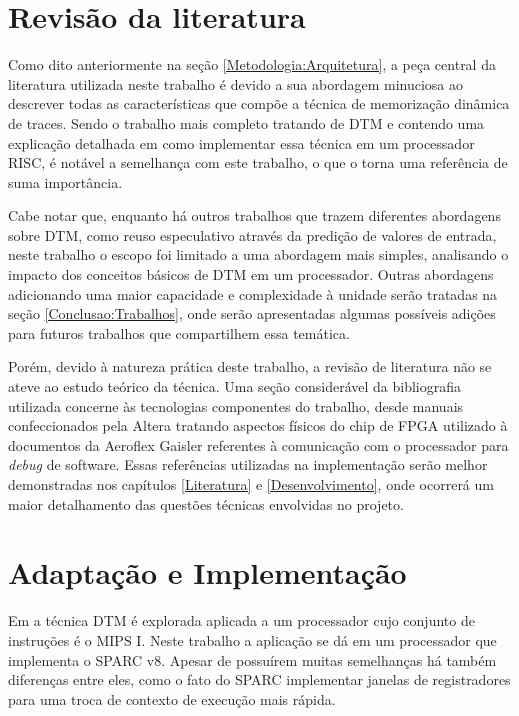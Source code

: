 \section{Revisão da literatura}
\label{Metodologia:Literatura}

Como dito anteriormente na seção \ref{Metodologia:Arquitetura}, a peça central da literatura utilizada neste trabalho é \cite{costa2001explorando} devido a sua abordagem minuciosa ao descrever todas as características que compõe a técnica de memorização dinâmica de traces. Sendo o trabalho mais completo tratando de DTM e contendo uma explicação detalhada em como implementar essa técnica em um processador RISC, é notável a semelhança com este trabalho, o que o torna uma referência de suma importância.

Cabe notar que, enquanto há outros trabalhos que trazem diferentes abordagens sobre DTM, como reuso especulativo através da predição de valores de entrada, neste trabalho o escopo foi limitado a uma abordagem mais simples, analisando o impacto dos conceitos básicos de DTM em um processador. Outras abordagens adicionando uma maior capacidade e complexidade à unidade serão tratadas na seção \ref{Conclusao:Trabalhos}, onde serão apresentadas algumas possíveis adições para futuros trabalhos que compartilhem essa temática.



Porém, devido à natureza prática deste trabalho, a revisão de literatura não se ateve ao estudo teórico da técnica. Uma seção considerável da bibliografia utilizada concerne às tecnologias componentes do trabalho, desde manuais confeccionados pela Altera tratando aspectos físicos do chip de FPGA utilizado à documentos da Aeroflex Gaisler referentes à comunicação com o processador para \textit{debug} de software. Essas referências utilizadas na implementação serão melhor demonstradas nos capítulos \ref{Literatura} e \ref{Desenvolvimento}, onde ocorrerá um maior detalhamento das questões técnicas envolvidas no projeto.


\section{Adaptação e Implementação}
\label{Metodologia:Implementacao}

Em \cite{costa2001explorando} a técnica DTM é explorada aplicada a um processador cujo conjunto de instruções é o MIPS I. Neste trabalho a aplicação se dá em um processador que implementa o SPARC v8. Apesar de possuírem muitas semelhanças há também diferenças entre eles, como o fato do SPARC implementar janelas de registradores para uma troca de contexto de execução mais rápida.

